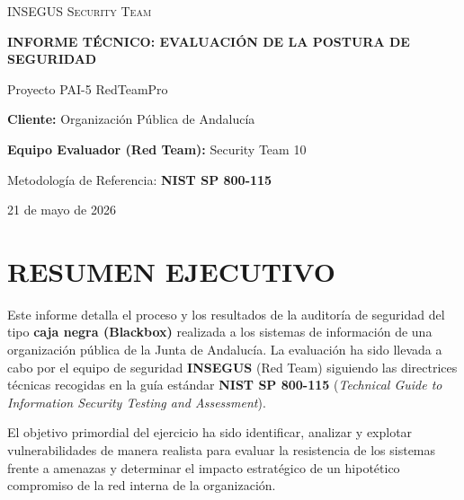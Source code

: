 \documentclass[11pt,a4paper]{article}
\begin{document}
\begin{titlepage}
    \centering
    \vspace*{1.5cm}
    \vspace{1cm}
    {\scshape\LARGE INSEGUS Security Team\par}
    \vspace{1.5cm}
    {\huge\bfseries INFORME TÉCNICO: EVALUACIÓN DE LA POSTURA DE SEGURIDAD\par}
    \vspace{0.5cm}
    {\large\Large Proyecto PAI-5 RedTeamPro\par}
    \vspace{2cm}
    {\large\textbf{Cliente:} Organización Pública de Andalucía\par}
    {\large\textbf{Equipo Evaluador (Red Team):} Security Team 10\par}
    \vfill
    {\large Metodología de Referencia: \textbf{NIST SP 800-115}\par}
    \vspace{0.8cm}
    {\large 21 de mayo de 2026\par}
\end{titlepage}

\newpage
\tableofcontents
\newpage


\section{RESUMEN EJECUTIVO}
Este informe detalla el proceso y los resultados de la auditoría de seguridad del tipo \textbf{caja negra (Blackbox)} realizada a los sistemas de información de una organización pública de la Junta de Andalucía. La evaluación ha sido llevada a cabo por el equipo de seguridad \textbf{INSEGUS} (Red Team) siguiendo las directrices técnicas recogidas en la guía estándar \textbf{NIST SP 800-115} (\emph{Technical Guide to Information Security Testing and Assessment}).

El objetivo primordial del ejercicio ha sido identificar, analizar y explotar vulnerabilidades de manera realista para evaluar la resistencia de los sistemas frente a amenazas y determinar el impacto estratégico de un hipotético compromiso de la red interna de la organización.
\end{document}
